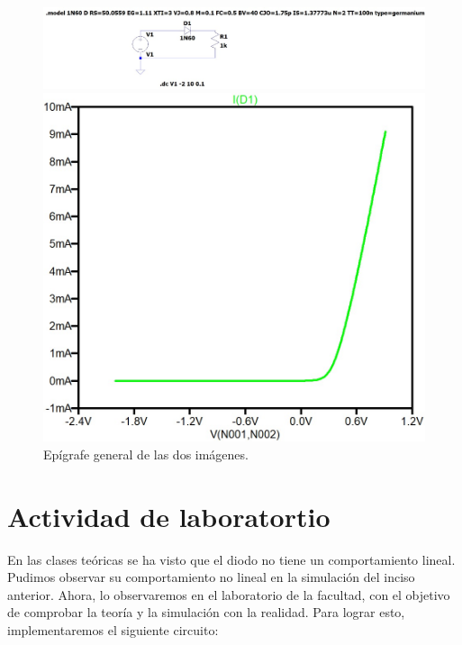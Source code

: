 \documentclass[chaptersright]{informeutn}
\begin{document}
\begin{figure}[h]
  \centering
  \begin{minipage}{0.45\textwidth}
    \centering
    \includegraphics[width=\linewidth]{pictures/curva_diodo_germanio_circuito.jpeg}
  \end{minipage}
  \hfill
  \begin{minipage}{0.45\textwidth}
    \centering
    \includegraphics[width=\linewidth]{pictures/curva_diodo_germanio_grafico.jpeg}
  \end{minipage}

  \vspace{0.5cm}
  
  \caption{Epígrafe general de las dos imágenes.}
  \label{d}
\end{figure}


\newpage

  \section{Actividad de laboratortio}
    En las clases teóricas se ha visto que el diodo no tiene un comportamiento lineal. Pudimos observar su 
    comportamiento no lineal en la simulación del inciso anterior. Ahora, lo observaremos en el laboratorio de la
    facultad, con el objetivo de comprobar la teoría y la simulación con la realidad. Para lograr esto, implementaremos
    el siguiente circuito:
\end{document}

